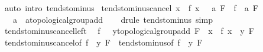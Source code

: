 \begin{isabellebody}
\ {\isacharparenleft}{\kern0pt}auto\ intro{\isacharcolon}{\kern0pt}\ tendsto{\isacharunderscore}{\kern0pt}minus{\isacharparenright}{\kern0pt}%
\endisatagproof
{\isafoldproof}%
%
\isadelimproof
\isanewline
%
\endisadelimproof
\isanewline
{}\isamarkupfalse%
\ tendsto{\isacharunderscore}{\kern0pt}minus{\isacharunderscore}{\kern0pt}cancel{\isacharcolon}{\kern0pt}\ {\isachardoublequoteopen}{\isacharparenleft}{\kern0pt}{\isacharparenleft}{\kern0pt}{\isasymlambda}x{\isachardot}{\kern0pt}\ {\isacharminus}{\kern0pt}\ f\ x{\isacharparenright}{\kern0pt}\ {\isasymlonglongrightarrow}\ {\isacharminus}{\kern0pt}\ a{\isacharparenright}{\kern0pt}\ F\ {\isasymLongrightarrow}\ {\isacharparenleft}{\kern0pt}f\ {\isasymlonglongrightarrow}\ a{\isacharparenright}{\kern0pt}\ F{\isachardoublequoteclose}\isanewline
\ \ \ a\ {\isacharcolon}{\kern0pt}{\isacharcolon}{\kern0pt}\ {\isachardoublequoteopen}{\isacharprime}{\kern0pt}a{\isacharcolon}{\kern0pt}{\isacharcolon}{\kern0pt}topological{\isacharunderscore}{\kern0pt}group{\isacharunderscore}{\kern0pt}add{\isachardoublequoteclose}\isanewline
%
\isadelimproof
\ \ %
\endisadelimproof
%
\isatagproof
{}\isamarkupfalse%
\ {\isacharparenleft}{\kern0pt}drule\ tendsto{\isacharunderscore}{\kern0pt}minus{\isacharparenright}{\kern0pt}\ simp%
\endisatagproof
{\isafoldproof}%
%
\isadelimproof
\isanewline
%
\endisadelimproof
\isanewline
{}\isamarkupfalse%
\ tendsto{\isacharunderscore}{\kern0pt}minus{\isacharunderscore}{\kern0pt}cancel{\isacharunderscore}{\kern0pt}left{\isacharcolon}{\kern0pt}\isanewline
\ \ {\isachardoublequoteopen}{\isacharparenleft}{\kern0pt}f\ {\isasymlonglongrightarrow}\ {\isacharminus}{\kern0pt}\ {\isacharparenleft}{\kern0pt}y{\isacharcolon}{\kern0pt}{\isacharcolon}{\kern0pt}{\isacharunderscore}{\kern0pt}{\isacharcolon}{\kern0pt}{\isacharcolon}{\kern0pt}topological{\isacharunderscore}{\kern0pt}group{\isacharunderscore}{\kern0pt}add{\isacharparenright}{\kern0pt}{\isacharparenright}{\kern0pt}\ F\ {\isasymlongleftrightarrow}\ {\isacharparenleft}{\kern0pt}{\isacharparenleft}{\kern0pt}{\isasymlambda}x{\isachardot}{\kern0pt}\ {\isacharminus}{\kern0pt}\ f\ x{\isacharparenright}{\kern0pt}\ {\isasymlonglongrightarrow}\ y{\isacharparenright}{\kern0pt}\ F{\isachardoublequoteclose}\isanewline
%
\isadelimproof
\ \ %
\endisadelimproof
%
\isatagproof
{}\isamarkupfalse%
\ tendsto{\isacharunderscore}{\kern0pt}minus{\isacharunderscore}{\kern0pt}cancel{\isacharbrackleft}{\kern0pt}of\ f\ {\isachardoublequoteopen}{\isacharminus}{\kern0pt}\ y{\isachardoublequoteclose}\ F{\isacharbrackright}{\kern0pt}\ \ tendsto{\isacharunderscore}{\kern0pt}minus{\isacharbrackleft}{\kern0pt}of\ f\ {\isachardoublequoteopen}{\isacharminus}{\kern0pt}\ y{\isachardoublequoteclose}\ F{\isacharbrackright}{\kern0pt}\isanewline

\end{isabellebody}
